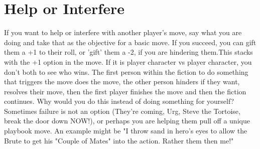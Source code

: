 \documentclass{tufte-book}
\begin{document}
\section{Help or Interfere}

If you want to help or interfere with another player's move, say what you are doing and take that as the objective for a basic move. If you succeed, you can gift them a +1 to their roll, or 'gift' them a -2, if you are hindering them.This stacks with the +1 option in the  move. If it is player character vs player character, you don't both  to see who wins. The first person within the fiction to do something that triggers the move does the move, the other person hinders if they want, resolves their move, then the first player finishes the move and then the fiction continues.
Why would you do this instead of doing something for yourself? Sometimes failure is not an option (They're coming, Urg, Steve the  Tortoise, break the door down NOW!), or perhaps you are helping them pull off a unique playbook move. An example might be "I throw sand in hero's eyes to allow the Brute to get his "Couple of Mates" into the action. Rather them then me!"
\end{document}

